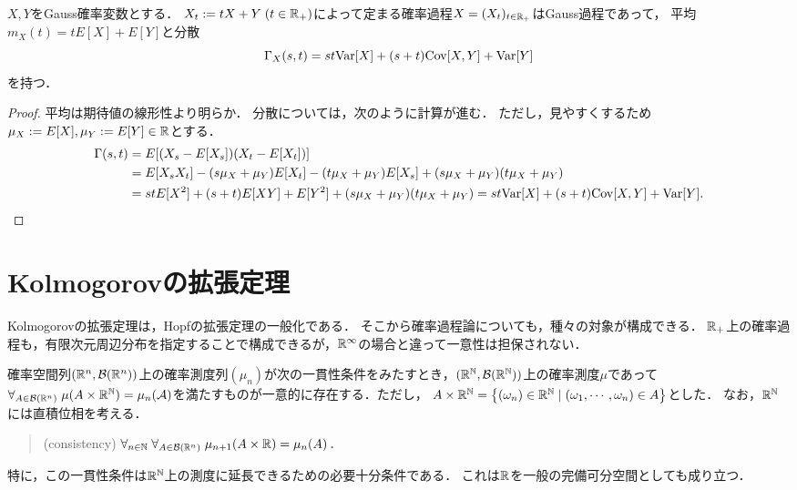\documentclass[uplatex,dvipdfmx]{jsreport}
\begin{document}
\begin{lemma}[共分散公式]
    $X,Y$をGauss確率変数とする．
    $X_t:=tX+Y\;(t\in\mathbb{R}_+)$によって定まる確率過程$X=(X_t)_{t\in\mathbb{R}_+}$はGauss過程であって，
    平均$m_X(t)=tE[X]+E[Y]$と分散
    \[\Gamma_X(s,t)=st\mathrm{Var}[X]+(s+t)\mathrm{Cov}[X,Y]+\mathrm{Var}[Y]\]
    を持つ．
\end{lemma}
\begin{proof}
    平均は期待値の線形性より明らか．
    分散については，次のように計算が進む．
    ただし，見やすくするため$\mu_X:=E[X],\mu_Y:=E[Y]\in\mathbb{R}$とする．
    \begin{align*}
        \Gamma(s,t)&=E[(X_s-E[X_s])(X_t-E[X_t])]\\
        &=E[X_sX_t]-(s\mu_X+\mu_Y)E[X_t]-(t\mu_X+\mu_Y)E[X_s]+(s\mu_X+\mu_Y)(t\mu_X+\mu_Y)\\
        &=stE[X^2]+(s+t)E[XY]+E[Y^2]+(s\mu_X+\mu_Y)(t\mu_X+\mu_Y)=st\mathrm{Var}[X]+(s+t)\mathrm{Cov}[X,Y]+\mathrm{Var}[Y].
    \end{align*}
\end{proof}

\section{Kolmogorovの拡張定理}

\begin{tcolorbox}[colframe=ForestGreen, colback=ForestGreen!10!white,breakable,colbacktitle=ForestGreen!40!white,coltitle=black,fonttitle=\bfseries\sffamily,
    title=]
    Kolmogorovの拡張定理は，Hopfの拡張定理の一般化である．
    そこから確率過程論についても，種々の対象が構成できる．
    $\mathbb{R}_+$上の確率過程も，有限次元周辺分布を指定することで構成できるが，$\mathbb{R}^\infty$の場合と違って一意性は担保されない．
\end{tcolorbox}

\begin{theorem}
    確率空間列$(\mathbb{R}^n,\mathcal{B}(\mathbb{R}^n))$上の確率測度列$(\mu_n)$が次の一貫性条件をみたすとき，$(\mathbb{R}^{\mathbb{N}},\mathcal{B}(\mathbb{R}^{\mathbb{N}}))$上の確率測度$\mu$であって$\forall_{A\in\mathcal{B}(\mathbb{R}^n)}\;\mu(A\times\mathbb{R}^{\mathbb{N}})=\mu_n(\mathcal{A})$を満たすものが一意的に存在する．ただし，
    $A\times\mathbb{R}^{\mathbb{N}}=\left\{(\omega_n)\in\mathbb{R}^{\mathbb{N}}\mid (\omega_1,\cdots,\omega_n)\in A\right\}$とした．
    なお，$\mathbb{R}^{\mathbb{N}}$には直積位相を考える．
    \begin{quotation}
        (consistency) $\forall_{n\in\mathbb{N}}\;\forall_{A\in\mathcal{B}(\mathbb{R}^n)}\;\mu_{n+1}(A\times\mathbb{R})=\mu_n(A)$．
    \end{quotation}
    特に，この一貫性条件は$\mathbb{R}^{\mathbb{N}}$上の測度に延長できるための必要十分条件である．
    これは$\mathbb{R}$を一般の完備可分空間としても成り立つ．
\end{theorem}
\end{document}

